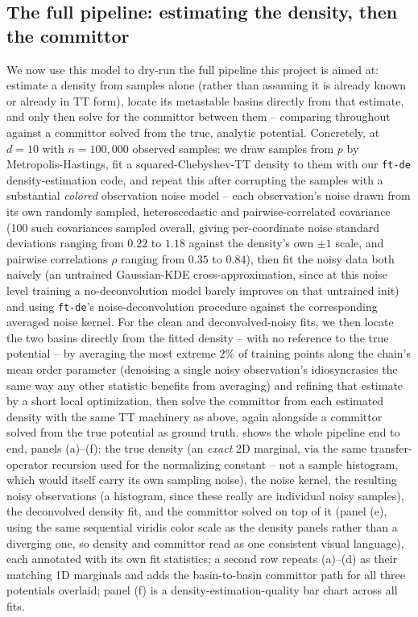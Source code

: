 \documentclass[11pt]{amsart}
\begin{document}
\subsection{The full pipeline: estimating the density, then the committor}
We now use this model to dry-run the full pipeline this project is aimed at: estimate a density from samples alone (rather than assuming it is already known or already in TT form), locate its metastable basins directly from that estimate, and only then solve for the committor between them -- comparing throughout against a committor solved from the true, analytic potential. Concretely, at $d=10$ with $n=100{,}000$ observed samples: we draw samples from $p$ by Metropolis-Hastings, fit a squared-Chebyshev-TT density to them with our \texttt{ft-de} density-estimation code, and repeat this after corrupting the samples with a substantial \emph{colored} observation noise model -- each observation's noise drawn from its own randomly sampled, heteroscedastic and pairwise-correlated covariance (100 such covariances sampled overall, giving per-coordinate noise standard deviations ranging from $0.22$ to $1.18$ against the density's own $\pm1$ scale, and pairwise correlations $\rho$ ranging from $0.35$ to $0.84$), then fit the noisy data both naively (an untrained Gaussian-KDE cross-approximation, since at this noise level training a no-deconvolution model barely improves on that untrained init) and using \texttt{ft-de}'s noise-deconvolution procedure against the corresponding averaged noise kernel. For the clean and deconvolved-noisy fits, we then locate the two basins directly from the fitted density -- with no reference to the true potential -- by averaging the most extreme $2\%$ of training points along the chain's mean order parameter (denoising a single noisy observation's idiosyncrasies the same way any other statistic benefits from averaging) and refining that estimate by a short local optimization, then solve the committor from each estimated density with the same TT machinery as above, again alongside a committor solved from the true potential as ground truth.  shows the whole pipeline end to end, panels (a)--(f): the true density (an \emph{exact} 2D marginal, via the same transfer-operator recursion used for the normalizing constant -- not a sample histogram, which would itself carry its own sampling noise), the noise kernel, the resulting noisy observations (a histogram, since these really are individual noisy samples), the deconvolved density fit, and the committor solved on top of it (panel (e), using the same sequential viridis color scale as the density panels rather than a diverging one, so density and committor read as one consistent visual language), each annotated with its own fit statistics; a second row repeats (a)--(d) as their matching 1D marginals and adds the basin-to-basin committor path for all three potentials overlaid; panel (f) is a density-estimation-quality bar chart across all fits.
\end{document}
